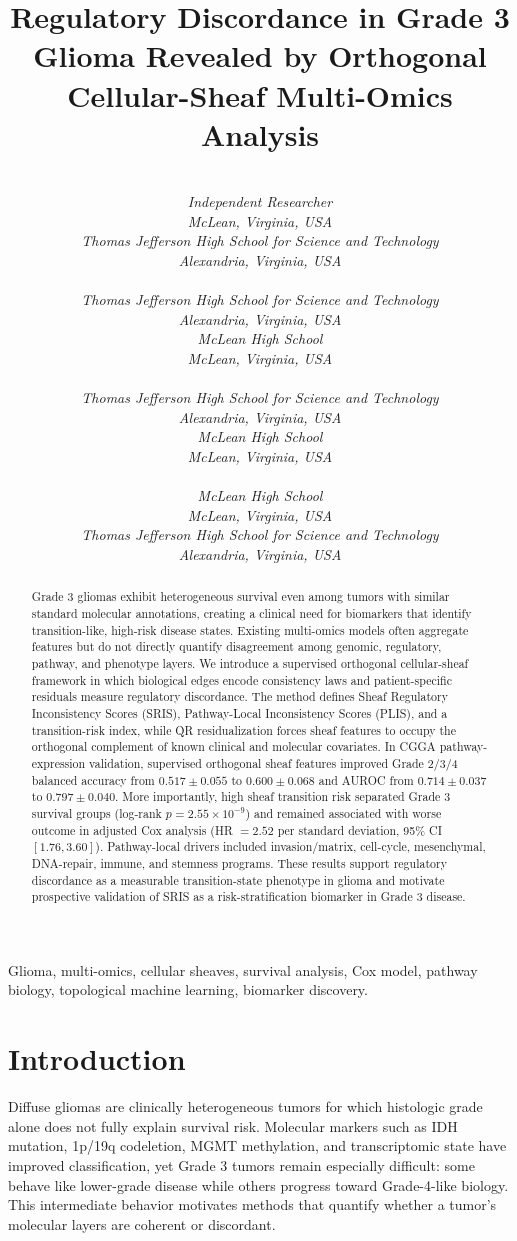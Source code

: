 \documentclass[conference]{IEEEtran}
\title{Regulatory Discordance in Grade 3 Glioma Revealed by Orthogonal Cellular-Sheaf Multi-Omics Analysis}
\author{%
\begin{tabular}{@{}c@{\hspace{1.0cm}}c@{}}
\begin{minipage}[t]{0.44\textwidth}\centering
{\normalsize Brandon Kong}\\[-0.05em]
{\small\textit{Independent Researcher}}\\[-0.05em]
{\small\textit{McLean, Virginia, USA}}
\end{minipage}
&
\begin{minipage}[t]{0.44\textwidth}\centering
{\normalsize Michael Wheeler}\\[-0.05em]
{\small\textit{Thomas Jefferson High School for Science and Technology}}\\[-0.05em]
{\small\textit{Alexandria, Virginia, USA}}
\end{minipage}
\\[3.25em]
\begin{minipage}[t]{0.44\textwidth}\centering
{\normalsize Mihir Kashyap}\\[-0.05em]
{\small\textit{Thomas Jefferson High School for Science and Technology}}\\[-0.05em]
{\small\textit{Alexandria, Virginia, USA}}
\end{minipage}
&
\begin{minipage}[t]{0.44\textwidth}\centering
{\normalsize Haomin Wu}\\[-0.05em]
{\small\textit{McLean High School}}\\[-0.05em]
{\small\textit{McLean, Virginia, USA}}
\end{minipage}
\\[3.25em]
\begin{minipage}[t]{0.44\textwidth}\centering
{\normalsize Leo Su}\\[-0.05em]
{\small\textit{Thomas Jefferson High School for Science and Technology}}\\[-0.05em]
{\small\textit{Alexandria, Virginia, USA}}
\end{minipage}
&
\begin{minipage}[t]{0.44\textwidth}\centering
{\normalsize Daksh Bhatia}\\[-0.05em]
{\small\textit{McLean High School}}\\[-0.05em]
{\small\textit{McLean, Virginia, USA}}
\end{minipage}
\\[3.25em]
\begin{minipage}[t]{0.44\textwidth}\centering
{\normalsize Sophearithy Tha}\\[-0.05em]
{\small\textit{McLean High School}}\\[-0.05em]
{\small\textit{McLean, Virginia, USA}}
\end{minipage}
&
\begin{minipage}[t]{0.44\textwidth}\centering
{\normalsize Alex Lee}\\[-0.05em]
{\small\textit{Thomas Jefferson High School for Science and Technology}}\\[-0.05em]
{\small\textit{Alexandria, Virginia, USA}}
\end{minipage}
\end{tabular}%
}
\begin{document}
\maketitle
\vspace{1.2em}

\begin{abstract}
Grade 3 gliomas exhibit heterogeneous survival even among tumors with similar standard molecular annotations, creating a clinical need for biomarkers that identify transition-like, high-risk disease states. Existing multi-omics models often aggregate features but do not directly quantify disagreement among genomic, regulatory, pathway, and phenotype layers. We introduce a supervised orthogonal cellular-sheaf framework in which biological edges encode consistency laws and patient-specific residuals measure regulatory discordance. The method defines Sheaf Regulatory Inconsistency Scores (SRIS), Pathway-Local Inconsistency Scores (PLIS), and a transition-risk index, while QR residualization forces sheaf features to occupy the orthogonal complement of known clinical and molecular covariates. In CGGA pathway-expression validation, supervised orthogonal sheaf features improved Grade 2/3/4 balanced accuracy from $0.517\pm0.055$ to $0.600\pm0.068$ and AUROC from $0.714\pm0.037$ to $0.797\pm0.040$. More importantly, high sheaf transition risk separated Grade 3 survival groups (log-rank $p=2.55\times10^{-9}$) and remained associated with worse outcome in adjusted Cox analysis (HR $=2.52$ per standard deviation, 95\% CI $[1.76,3.60]$). Pathway-local drivers included invasion/matrix, cell-cycle, mesenchymal, DNA-repair, immune, and stemness programs. These results support regulatory discordance as a measurable transition-state phenotype in glioma and motivate prospective validation of SRIS as a risk-stratification biomarker in Grade 3 disease.
\end{abstract}

\begin{IEEEkeywords}
Glioma, multi-omics, cellular sheaves, survival analysis, Cox model, pathway biology, topological machine learning, biomarker discovery.
\end{IEEEkeywords}

\section{Introduction}
Diffuse gliomas are clinically heterogeneous tumors for which histologic grade alone does not fully explain survival risk. Molecular markers such as IDH mutation, 1p/19q codeletion, MGMT methylation, and transcriptomic state have improved classification, yet Grade 3 tumors remain especially difficult: some behave like lower-grade disease while others progress toward Grade-4-like biology. This intermediate behavior motivates methods that quantify whether a tumor's molecular layers are coherent or discordant.
\end{document}
